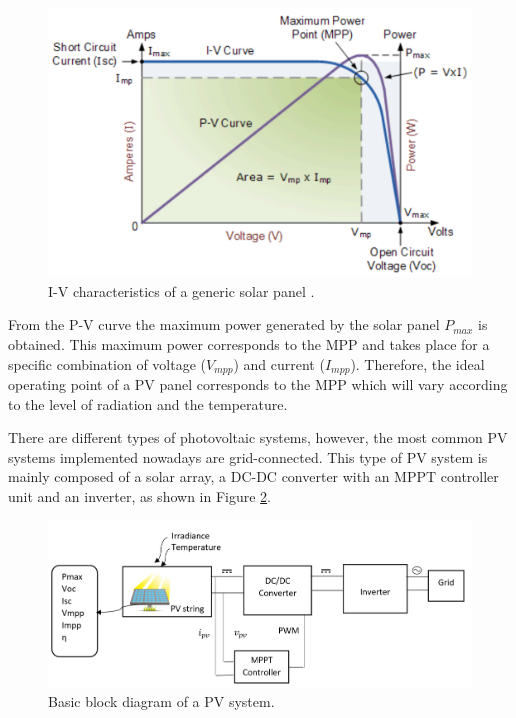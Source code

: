 \begin{figure}[htbp]
	\begin{center}
		\includegraphics[width=0.88\linewidth]{../Pictures/IVcurve}
		\caption{I-V characteristics of a generic solar panel \cite{IVcurves}.}
		\label{fig:mpp}
	\end{center}
\end{figure}

From the P-V curve the maximum power generated by the solar panel $P_{max}$ is obtained. This maximum power corresponds to the MPP and takes place for a specific combination of voltage ($V_{mpp}$) and current ($I_{mpp}$). Therefore, the ideal operating point of a PV panel corresponds to the MPP which will vary according to the level of radiation and the temperature. 

There are different types of photovoltaic systems, however, the most common PV systems implemented nowadays are grid-connected. This type of PV system is mainly composed of a solar array, a DC-DC converter with an MPPT controller unit and an inverter, as shown in Figure \ref{fig:PVsystemblocks}. 

\begin{figure}[htbp]
	\includegraphics[width=\linewidth]{../Pictures/PV_system_blocks}
	\caption{Basic block diagram of a PV system.}
	\label{fig:PVsystemblocks}
\end{figure}

